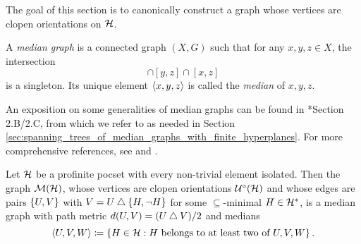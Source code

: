\documentclass{amsart}
\begin{document}
    The goal of this section is to canonically construct a graph whose vertices are clopen orientations on $\mathcal{H}$.

    \begin{definition}
        A \textit{median graph} is a connected graph $(X,G)$ such that for any $x,y,z\in X$, the intersection
        \begin{equation*}
            [x,y]\cap[y,z]\cap[x,z]
        \end{equation*}
        is a singleton. Its unique element $\left\langle x,y,z\right\rangle$ is called the \textit{median} of $x,y,z$.
    \end{definition}

    An exposition on some generalities of median graphs can be found in \cite{CPTT23}*{Section 2.B/2.C}, from which we refer to as needed in Section \ref{sec:spanning_trees_of_median_graphs_with_finite_hyperplanes}. For more comprehensive references, see \cite{Rol98} and \cite{Bow22}.

    \begin{theorem}\label{thm:construction_of_dual_median_graph}
        Let $\mathcal{H}$ be a profinite pocset with every non-trivial element isolated. Then the graph $\mathcal{M}(\mathcal{H})$, whose vertices are clopen orientations $\mathcal{U}^\circ(\mathcal{H})$ and whose edges are pairs $\left\{U,V\right\}$ with $V=U\bigtriangleup\left\{H,\lnot H\right\}$ for some $\subseteq$-minimal $H\in\mathcal{H}^\ast$, is a median graph with path metric $d(U,V)=(U\bigtriangleup V)/2$ and medians
        \begin{equation*}
            \left\langle U,V,W\right\rangle\coloneqq\left\{H\in\mathcal{H}: H\textrm{ belongs to at least two of }U,V,W\right\}.
        \end{equation*}
    \end{theorem}
\end{document}
